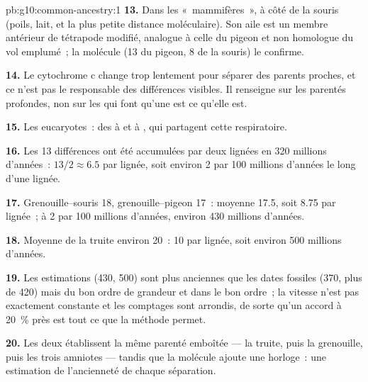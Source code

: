 \begin{solution}{pb:g10:common-ancestry:1}
\textbf{13.} Dans les «~mammifères~», à côté de la souris (poils, lait,
et la plus petite distance moléculaire). Son aile est un membre
antérieur de tétrapode modifié, analogue à celle du pigeon et non
homologue du vol emplumé~; la molécule (13 du pigeon, 8 de la souris)
le confirme.

\textbf{14.} Le cytochrome c change trop lentement pour séparer des
parents proches, et ce n'est pas le  responsable des différences
visibles. Il renseigne sur les parentés profondes, non sur les 
qui font qu'une  est ce qu'elle est.

\textbf{15.} Les eucaryotes~: des  à  et à ,
qui partagent cette  respiratoire.

\textbf{16.} Les 13 différences ont été accumulées par deux lignées en
320 millions d'années~: $13/2 \approx 6.5$ par lignée, soit environ 2
par 100 millions d'années le long d'une lignée.

\textbf{17.} Grenouille--souris 18, grenouille--pigeon 17~: moyenne
17.5, soit 8.75 par lignée~; à 2 par 100 millions d'années, environ 430
millions d'années.

\textbf{18.} Moyenne de la truite environ 20~: 10 par lignée, soit
environ 500 millions d'années.

\textbf{19.} Les estimations (430, 500) sont plus anciennes que les
dates fossiles (370, plus de 420) mais du bon ordre de grandeur et dans
le bon ordre~; la vitesse n'est pas exactement constante et les
comptages sont arrondis, de sorte qu'un accord à 20~\% près est tout ce
que la méthode permet.

\textbf{20.} Les deux établissent la même parenté emboîtée --- la
truite, puis la grenouille, puis les trois amniotes --- tandis que la
molécule ajoute une horloge~: une estimation de l'ancienneté de chaque
séparation.
\end{solution}
